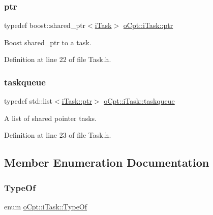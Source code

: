 \subsubsection{\texorpdfstring{ptr}{ptr}}
{\footnotesize\ttfamily typedef boost\+::shared\+\_\+ptr$<$\hyperlink{classo_cpt_1_1i_task}{i\+Task}$>$ \hyperlink{classo_cpt_1_1i_task_add2b02b5c97e63a1b7d6943ea4571543}{o\+Cpt\+::i\+Task\+::ptr}}



Boost shared\+\_\+ptr to a task. 



Definition at line 22 of file Task.\+h.

\hypertarget{classo_cpt_1_1i_task_a8f949d091241347ea0cdfb8625b4dbca}{}\label{classo_cpt_1_1i_task_a8f949d091241347ea0cdfb8625b4dbca} 
\subsubsection{\texorpdfstring{taskqueue}{taskqueue}}
{\footnotesize\ttfamily typedef std\+::list$<$\hyperlink{classo_cpt_1_1i_task_add2b02b5c97e63a1b7d6943ea4571543}{i\+Task\+::ptr}$>$ \hyperlink{classo_cpt_1_1i_task_a8f949d091241347ea0cdfb8625b4dbca}{o\+Cpt\+::i\+Task\+::taskqueue}}



A list of shared pointer tasks. 



Definition at line 23 of file Task.\+h.



\subsection{Member Enumeration Documentation}
\hypertarget{classo_cpt_1_1i_task_a10d8726eb8957c2c305f468cf15b9f11}{}\label{classo_cpt_1_1i_task_a10d8726eb8957c2c305f468cf15b9f11} 
\subsubsection{\texorpdfstring{Type\+Of}{TypeOf}}
{\footnotesize\ttfamily enum \hyperlink{classo_cpt_1_1i_task_a10d8726eb8957c2c305f468cf15b9f11}{o\+Cpt\+::i\+Task\+::\+Type\+Of}}

